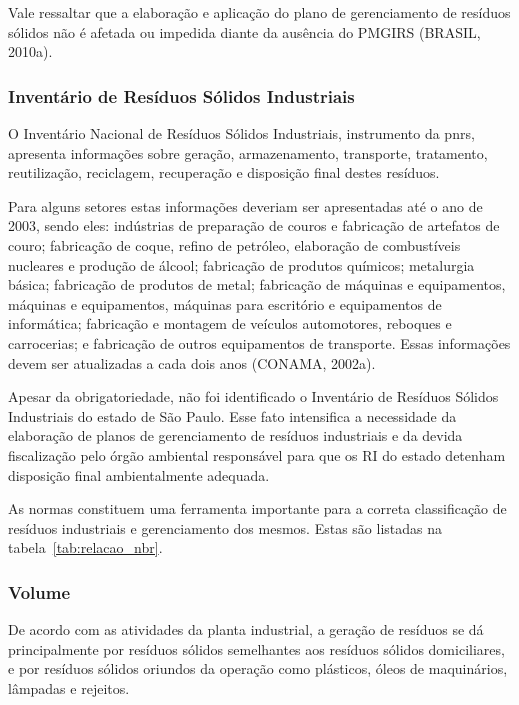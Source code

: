 	Vale ressaltar que a elaboração e aplicação do plano de gerenciamento de resíduos sólidos não é afetada ou impedida diante da ausência do PMGIRS (BRASIL, 2010a).

	\subsubsection{Inventário de Resíduos Sólidos Industriais}
	
	O Inventário Nacional de Resíduos Sólidos Industriais, instrumento da \gls{pnrs}, apresenta informações sobre geração, armazenamento, transporte, tratamento, reutilização, reciclagem, recuperação e disposição final destes resíduos. 
	
	Para alguns setores estas informações deveriam ser apresentadas até o ano de 2003, sendo eles: indústrias de preparação de couros e fabricação de artefatos de couro; fabricação de coque, refino de petróleo, elaboração de combustíveis nucleares e produção de álcool; fabricação de produtos químicos; metalurgia básica; fabricação de produtos de metal; fabricação de máquinas e equipamentos, máquinas e equipamentos, máquinas para escritório e equipamentos de informática; fabricação e montagem de veículos automotores, reboques e carrocerias; e fabricação de outros equipamentos de transporte. Essas informações devem ser atualizadas a cada dois anos (CONAMA, 2002a).
	
	Apesar da obrigatoriedade, não foi identificado o Inventário de Resíduos Sólidos Industriais do estado de São Paulo. Esse fato intensifica a necessidade da elaboração de planos de gerenciamento de resíduos industriais e da devida fiscalização pelo órgão ambiental responsável para que os RI do estado detenham disposição final ambientalmente adequada.
	
	As normas constituem uma ferramenta importante para a correta classificação de resíduos industriais e gerenciamento dos mesmos. Estas são listadas na tabela~\ref{tab:relacao_nbr}.
	
%	
	
	\subsubsection{Volume}
	De acordo com as atividades da planta industrial, a geração de resíduos se dá principalmente por resíduos sólidos semelhantes aos resíduos sólidos domiciliares, e por resíduos sólidos oriundos da operação como plásticos, óleos de maquinários, lâmpadas e rejeitos.
	
